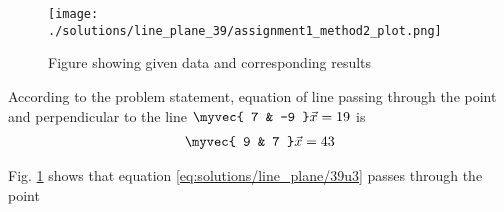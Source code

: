 \begin{figure}[h!] 
	\centering
	\texttt{[image: ./solutions/line\_plane\_39/assignment1\_method2\_plot.png]}
	\caption{Figure showing given data and corresponding results}
	\label{myfigsolutions/line_plane_39/}
\end{figure}

According to the problem statement, equation of line passing through the point  and perpendicular to the line $\myvec{ 7 & -9 }\vec{x}=19$ is 
\begin{align}
  \myvec{ 9 & 7 }\vec{x}=43
  \label{eq:solutions/line_plane/39u3}
\end{align}

Fig. 	\ref{myfigsolutions/line_plane_39/}
shows that equation \eqref{eq:solutions/line_plane/39u3} passes through the point 

